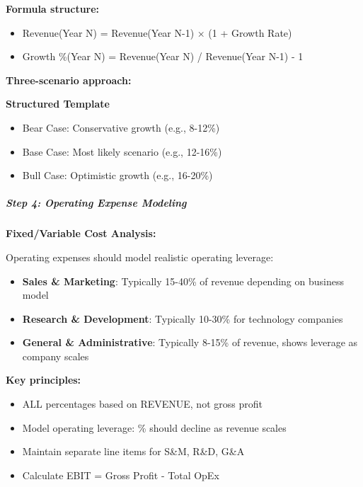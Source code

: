 \documentclass[11pt]{article}
\begin{document}
\textbf{Formula structure:}

\begin{itemize}[leftmargin=*,itemsep=2pt,topsep=2pt]
\item {} Revenue(Year N) = Revenue(Year N-1) × (1 + Growth Rate)
\item {} Growth \%(Year N) = Revenue(Year N) / Revenue(Year N-1) - 1
\end{itemize}

\textbf{Three-scenario approach:}

\textbf{Structured Template}
\begin{itemize}[leftmargin=*,itemsep=2pt,topsep=2pt]
\item {} Bear Case: Conservative growth (e.g., 8-12\%)
\item {} Base Case: Most likely scenario (e.g., 12-16\%)
\item {} Bull Case: Optimistic growth (e.g., 16-20\%)
\end{itemize}

\subparagraph{Step 4: Operating Expense Modeling}\mbox{}\par

\textbf{Fixed/Variable Cost Analysis:}


Operating expenses should model realistic operating leverage:

\begin{itemize}[leftmargin=*,itemsep=2pt,topsep=2pt]
\item {} \textbf{Sales \& Marketing}: Typically 15-40\% of revenue depending on business model
\item {} \textbf{Research \& Development}: Typically 10-30\% for technology companies
\item {} \textbf{General \& Administrative}: Typically 8-15\% of revenue, shows leverage as company scales
\end{itemize}

\textbf{Key principles:}

\begin{itemize}[leftmargin=*,itemsep=2pt,topsep=2pt]
\item {} ALL percentages based on REVENUE, not gross profit
\item {} Model operating leverage: \% should decline as revenue scales
\item {} Maintain separate line items for S\&M, R\&D, G\&A
\item {} Calculate EBIT = Gross Profit - Total OpEx
\end{itemize}
\end{document}
